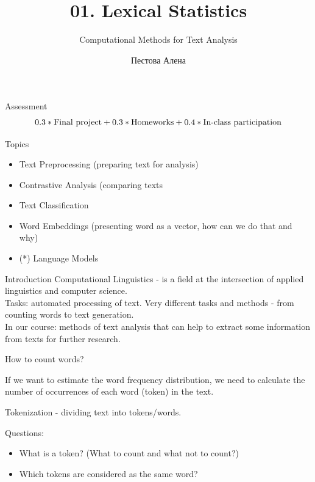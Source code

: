 \documentclass{beamer}
\title{01. Lexical Statistics}
\subtitle{Computational Methods for Text Analysis}
\author{Пестова Алена}
\institute{НИУ ВШЭ Санкт-Петербург}
\begin{document}
    \begin{frame}
        \titlepage
    \end{frame}

    \begin{frame}{Assessment}
        \begin{equation}
            $$0.3 * \text{Final project} + 0.3 * \text{Homeworks} + 0.4 * \text{In-class participation}$$
        \end{equation}
    \end{frame}


    \begin{frame}{Topics}
        \begin{itemize}
            \item Text Preprocessing (preparing text for analysis)
            \item Contrastive Analysis (comparing texts
            \item Text Classification
            \item Word Embeddings (presenting word as a vector, how can we do that and why)
            \item (*) Language Models
        \end{itemize}
    \end{frame}

    \begin{frame}{Introduction}
        Computational Linguistics - is a field at the intersection of applied linguistics and computer science.
\\
        Tasks: automated processing of text. Very different tasks and methods -  from counting words to text generation.
\\
        In our course: methods of text analysis that can help to extract some information from texts for further research.

    \end{frame}

    

    \begin{frame}{How to count words?}

        If we want to estimate the word frequency distribution, we need to calculate the number of
        occurrences of each word (token) in the text.

        Tokenization - dividing text into tokens/words.

        Questions:

        \begin{itemize}
            \item What is a token? (What to count and what not to count?)
            \item Which tokens are considered as the same word?
        \end{itemize}
    \end{frame}
\end{document}
